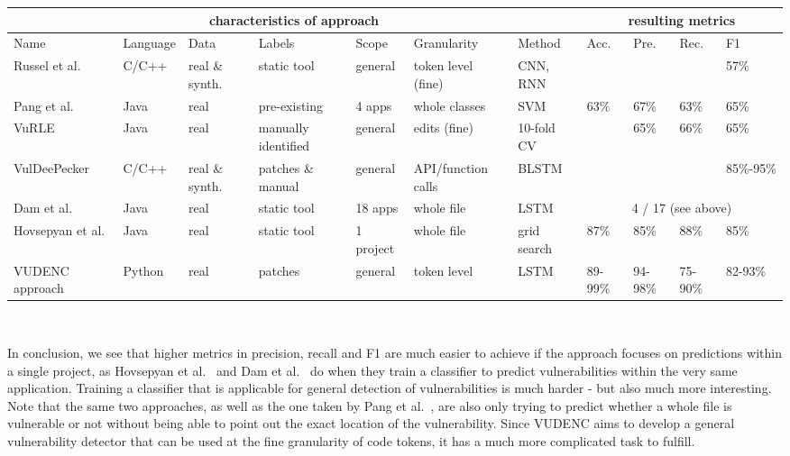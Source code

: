 \documentclass[
a4paper,
pagesize,
pdftex,
12pt,
twoside, %
BCOR=5mm, %
ngerman,
fleqn,
final,
]{scrartcl}
\begin{document}
	\scriptsize
	\begin{tabular}{ | p{1.8cm} | p{1.2cm}|  p{0.7cm}| p{1.4cm} |  p{1.2cm} | p{1.5cm} | p{1.1cm} || p{0.4cm}|p{0.4cm}|p{0.4cm}|p{0.4cm}|  }
		\hline
		\multicolumn{7}{|c||}{characteristics of approach} & \multicolumn{4}{c|}{resulting metrics} \\
		\hline
		Name &  Language & Data & Labels & Scope &Granularity & Method & Acc. & Pre. & Rec. & F1  \\
		\hline
		Russel et al. & C/C++ & real \& synth. & static tool & general & token level (fine) & CNN, RNN &  &   &   &  57\%  \\
		\hline
		Pang et al. & Java & real  & pre-existing  & 4 apps & whole classes & SVM & 63\% & 67\%  & 63\%  & 65\%    \\
		\hline
		VuRLE & Java & real  & manually identified  & general & edits (fine) & 10-fold CV &  & 65\%  & 66\%  & 65\%    \\
		\hline
		VulDeePecker & C/C++ & real \& synth.  & patches \& manual & general & API/function calls & BLSTM &  &   &  & 85\%-95\%    \\
		\hline
		Dam et al. & Java & real &static tool & 18 apps & whole file & LSTM & \multicolumn{4}{c|}{ 4 / 17 (see above)}   \\
		\hline
		Hovsepyan et al. & Java & real  &static tool  & 1 project & whole file & grid search & 87\% & 	85\%  & 88\%  & 85\%   \\
		\hline
		VUDENC approach & Python & real  &patches& general  & token level & LSTM & 89-99\% & 94-98\% & 75-90\% & 82-93\%   \\
		\hline
		\hline 
	\end{tabular}\\
	\normalsize
	
	In conclusion, we see that higher metrics in precision, recall and F1 are much easier to achieve if the approach focuses on predictions within a single project, as Hovsepyan et al.~\cite{Hovsepyan.2012} and Dam et al.~\cite{Dam.2017} do when they train a classifier to predict vulnerabilities within the very same application. Training a classifier that is applicable for general detection of vulnerabilities is much harder - but also much more interesting. Note that the same two approaches, as well as the one taken by Pang et al.~\cite{Pang.2015}, are also only trying to predict whether a whole file is vulnerable or not without being able to point out the exact location of the vulnerability. Since VUDENC aims to develop a general vulnerability detector that can be used at the fine granularity of code tokens, it has a much more complicated task to fulfill.
	
\end{document}
